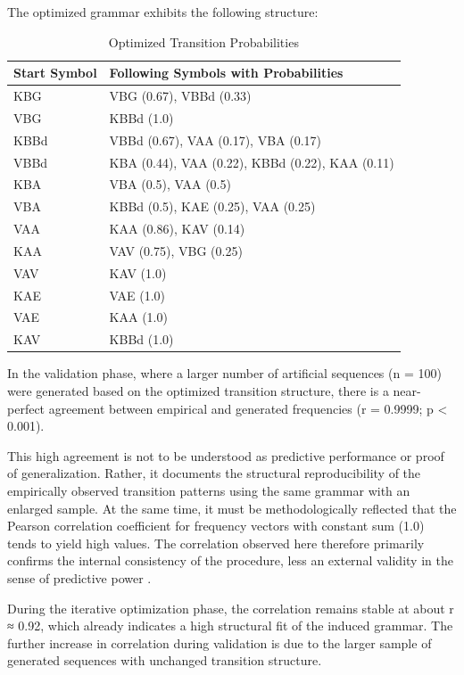 \documentclass[
  12pt,
  a4paper,
  oneside,
  titlepage
]{article}
\begin{document}
The optimized grammar exhibits the following structure:

\begin{table}[h]
\centering
\caption{Optimized Transition Probabilities}
\label{tab:results}
\begin{tabular}{@{} l l @{}}
\toprule
\textbf{Start Symbol} & \textbf{Following Symbols with Probabilities} \\
\midrule
KBG & VBG (0.67), VBBd (0.33) \\
VBG & KBBd (1.0) \\
KBBd & VBBd (0.67), VAA (0.17), VBA (0.17) \\
VBBd & KBA (0.44), VAA (0.22), KBBd (0.22), KAA (0.11) \\
KBA & VBA (0.5), VAA (0.5) \\
VBA & KBBd (0.5), KAE (0.25), VAA (0.25) \\
VAA & KAA (0.86), KAV (0.14) \\
KAA & VAV (0.75), VBG (0.25) \\
VAV & KAV (1.0) \\
KAE & VAE (1.0) \\
VAE & KAA (1.0) \\
KAV & KBBd (1.0) \\
\bottomrule
\end{tabular}
\end{table}

In the validation phase, where a larger number of artificial sequences (n = 100) were 
generated based on the optimized transition structure, there is a near-perfect 
agreement between empirical and generated frequencies (r = 0.9999; p < 0.001).

This high agreement is not to be understood as predictive performance or proof of 
generalization. Rather, it documents the structural reproducibility of the empirically 
observed transition patterns using the same grammar with an enlarged sample. At the 
same time, it must be methodologically reflected that the Pearson correlation 
coefficient for frequency vectors with constant sum (1.0) tends to yield high values. 
The correlation observed here therefore primarily confirms the internal consistency 
of the procedure, less an external validity in the sense of predictive power 
\citep[ p.~489]{Flick2019}.

During the iterative optimization phase, the correlation remains stable at about 
r ≈ 0.92, which already indicates a high structural fit of the induced grammar. The 
further increase in correlation during validation is due to the larger sample of 
generated sequences with unchanged transition structure.
\end{document}
